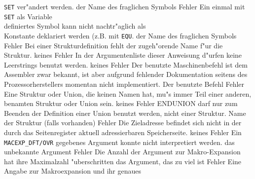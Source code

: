 \documentclass[12pt,a4paper,twoside]{report}
\newcommand{\tty}[1]{{\tt #1}}
\begin{document}
\begin{description}
{                {\tt SET} ver"andert werden.}
               {der Name des fraglichen Symbols}
               {Fehler}
               {Ein einmal mit {\tt SET} als Variable\\
                definiertes Symbol kann nicht nachtr"aglich als\\
                Konstante deklariert werden (z.B. mit {\tt EQU}.}
               {der Name des fraglichen Symbols}
               {Fehler}
               {Bei einer Strukturdefinition fehlt der zugeh"orende
                Name f"ur die Struktur.}
               {keines}
               {Fehler}
               {In der Argumentenliste dieser Anweisung d"urfen keine
                Leerstrings benutzt werden.}
               {keines}
               {Fehler}
               {Der benutzte Maschinenbefehl ist dem Assembler
                zwar bekannt, ist aber aufgrund fehlender
                Dokumentation seitens des Prozessorherstellers
                momentan nicht implementiert.}
               {Der benutzte Befehl}
               {Fehler}
               {Eine Struktur oder Union, die keinen Namen hat, mu"s
                immer Teil einer anderen, benamten Struktur oder Union
                sein.}
               {keines}
               {Fehler}
               {ENDUNION darf nur zum Beenden der Definition einer
                Union benutzt werden, nicht einer Struktur.}
               {Name der Struktur (falls vorhanden)}
               {Fehler}
               {Die Zieladresse befindet sich nicht in der durch
                das Seitenregister aktuell adressierbaren
                Speicherseite.}
               {keines}
               {Fehler}
               {Ein \tty{MACEXP\_DFT/OVR} gegebenes Argument konnte nicht
                interpretiert werden.}
               {das unbekannte Argument}
               {Fehler}
               {Die Anzahl der Argument zur Makro-Expansion hat ihre Maximalzahl "uberschritten}
               {das Argument, das zu viel ist}
               {Fehler}
               {Eine Angabe zur Makroexpansion und ihr genaues
}
\end{description}
\end{document}
